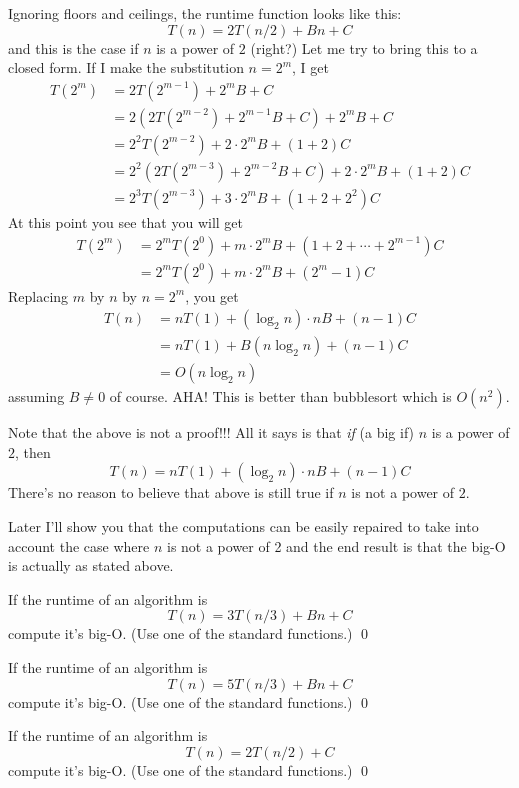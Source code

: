 Ignoring floors and ceilings, 
the runtime function looks like this:
\[
T(n) = 2T(n/2) + Bn + C
\]
and this is the case if $n$ is a power of $2$ (right?)
Let me try to bring this to a closed form.
If I make the substitution $n = 2^m$, I get
\begin{align*}
T(2^m) 
&= 2T(2^{m-1}) + 2^mB + C \\
&= 2(2T(2^{m-2}) + 2^{m-1}B + C)+ 2^mB + C \\
&= 2^2 T(2^{m-2}) + 2 \cdot 2^mB + (1+2)C \\
&= 2^2 (2T(2^{m-3}) + 2^{m-2}B + C) + 2 \cdot 2^mB + (1+2) C\\
&= 2^3T(2^{m-3}) + 3 \cdot 2^m B + (1+2+2^2)C
\end{align*}
At this point you see that you will get
\begin{align*}
T(2^m) 
&= 2^mT(2^0) + m \cdot 2^m B + (1+2+\cdots+2^{m-1}) C \\
&= 2^mT(2^0) + m \cdot 2^m B + (2^m - 1) C
\end{align*}
Replacing $m$ by $n$ by $n = 2^m$, you get
\begin{align*}
T(n) 
&= nT(1) + (\log_2 n) \cdot n B + (n - 1) C\\
&= nT(1) + B(n\log_2 n) + (n - 1)C \\
&= O(n \log_2 n)
\end{align*}
assuming $B \neq 0$ of course.
AHA! This is better than bubblesort which is $O(n^2)$.

Note that the above is not a proof!!!
All it says is that \textit{if} (a big if) $n$ is a power of $2$, 
then
\[
T(n) = nT(1) + (\log_2 n) \cdot n B + (n - 1) C
\]
There's no reason to believe that above is still true if $n$ is 
not a power of $2$.

Later I'll show you that the computations can be easily
repaired to take into account the case where $n$ is not a power of 2
and the end result is that the big-O is actually as stated above.

\begin{ex}
If the runtime of an algorithm is
\[
T(n) = 3T(n/3) + Bn + C
\]
compute it's big-O. (Use one of the standard functions.)
\qed
\end{ex}

\begin{ex}
If the runtime of an algorithm is
\[
T(n) = 5T(n/3) + Bn + C
\]
compute it's big-O. (Use one of the standard functions.)
\qed
\end{ex}

\begin{ex}
If the runtime of an algorithm is
\[
T(n) = 2T(n/2) + C
\]
compute it's big-O. (Use one of the standard functions.)
\qed
\end{ex}

